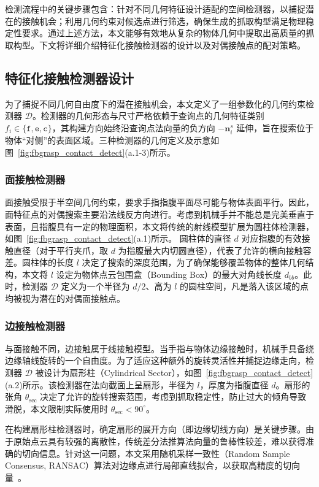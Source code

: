 检测流程中的关键步骤包含：针对不同几何特征设计适配的空间检测器，以捕捉潜在的接触机会；利用几何约束对候选点进行筛选，确保生成的抓取构型满足物理稳定性要求。通过上述方法，本文能够有效地从复杂的物体几何中提取出高质量的抓取构型。下文将详细介绍特征化接触检测器的设计以及对偶接触点的配对策略。

\subsection{特征化接触检测器设计}
\label{sec:contact_detector}

为了捕捉不同几何自由度下的潜在接触机会，本文定义了一组参数化的几何约束检测器 $\mathcal{D}$。检测器的几何形态与尺寸严格依赖于查询点的几何特征类别 $f_i \in \{\mathtt{f}, \mathtt{e}, \mathtt{c}\}$，其构建方向始终沿查询点法向量的负方向 $-\mathbf{n}_i^s$ 延伸，旨在搜索位于物体“对侧”的表面区域。三种检测器的几何定义及示意如图~\ref{fig:fbgrasp_contact_detect}(a.1-3)所示。


\subsubsection{面接触检测器}
面接触受限于半空间几何约束，要求手指指腹平面尽可能与物体表面平行。因此，面特征点的对偶搜索主要沿法线反方向进行。考虑到机械手并不能总是完美垂直于表面，且指腹具有一定的物理面积，本文将传统的射线模型扩展为圆柱体检测器，如图~\ref{fig:fbgrasp_contact_detect}(a.1)所示。
圆柱体的直径 $d$ 对应指腹的有效接触直径（对于平行夹爪，取 $d$ 为指腹最大内切圆直径），代表了允许的横向接触容差。圆柱体的长度 $l$ 决定了搜索的深度范围，为了确保能够覆盖物体的整体几何结构，本文将 $l$ 设定为物体点云包围盒（Bounding Box）的最大对角线长度 $d_{bb}$。此时，检测器 $\mathcal{D}$ 定义为一个半径为 $d/2$、高为 $l$ 的圆柱空间，凡是落入该区域的点均被视为潜在的对偶面接触点。

\subsubsection{边接触检测器}
与面接触不同，边接触属于线接触模型。当手指与物体边缘接触时，机械手具备绕边缘轴线旋转的一个自由度。为了适应这种额外的旋转灵活性并捕捉边缘走向，检测器 $\mathcal{D}$ 被设计为扇形柱（Cylindrical Sector），如图~\ref{fig:fbgrasp_contact_detect}(a.2)所示。该检测器在法向截面上呈扇形，半径为 $l$，厚度为指腹直径 $d$。扇形的张角 $\theta_{\mathrm{sec}}$ 决定了允许的旋转搜索范围，考虑到抓取稳定性，防止过大的倾角导致滑脱，本文限制实际使用时 $\theta_{\mathrm{sec}} < 90^\circ$。

在构建扇形柱检测器时，确定扇形的展开方向（即边缘切线方向）是关键步骤。由于原始点云具有较强的离散性，传统差分法推算法向量的鲁棒性较差，难以获得准确的切向信息。针对这一问题，本文采用随机采样一致性（Random Sample Consensus, RANSAC）算法对边缘点进行局部直线拟合，以获取高精度的切向量~\cite{fischler_random_1981}。

